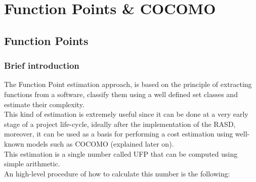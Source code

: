 \newpage
\def\arraystretch{1.5}
\section{Function Points \& COCOMO}
\subsection{Function Points}
\subsubsection{Brief introduction}
The Function Point estimation approach, is based on the principle of extracting functions from a software, classify them using a well defined set classes and estimate their complexity. \\ This kind of estimation is extremely useful since it can be done at a very early stage of a project life-cycle, ideally after the implementation of the RASD, moreover, it can be used as a basis for performing a cost estimation using well-known models such as COCOMO (explained later on). \\
This estimation is a single number called UFP that can be computed using simple arithmetic. \\
An high-level procedure of how to calculate this number is the following:
